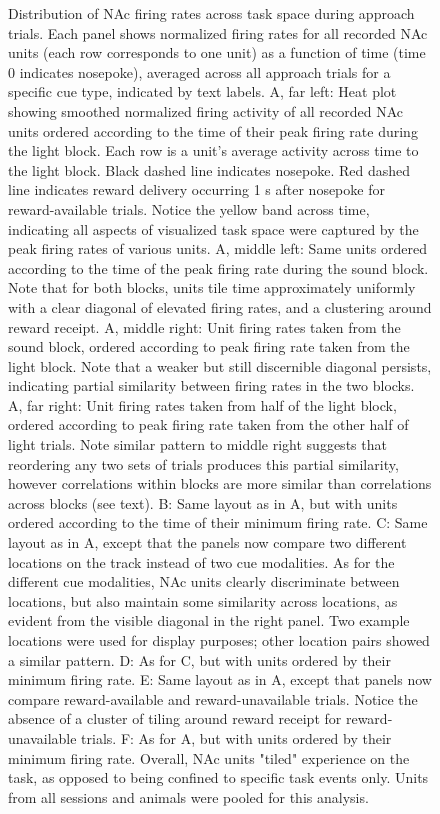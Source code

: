 \documentclass[11pt]{article}
\begin{document}
\begin{figure}[h]
\caption{Distribution of NAc firing rates across task space during approach trials. Each panel shows normalized firing rates for all recorded NAc units (each row corresponds to one unit) as a function of time (time 0 indicates nosepoke), averaged across all approach trials for a specific cue type, indicated by text labels. A, far left: Heat plot showing smoothed normalized firing activity of all recorded NAc units ordered according to the time of their peak firing rate during the light block. Each row is a unit’s average activity across time to the light block. Black dashed line indicates nosepoke. Red dashed line indicates reward delivery occurring 1 s after nosepoke for reward-available trials. Notice the yellow band across time, indicating all aspects of visualized task space were captured by the peak firing rates of various units. A, middle left: Same units ordered according to the time of the peak firing rate during the sound block. Note that for both blocks, units tile time approximately uniformly with a clear diagonal of elevated firing rates, and a clustering around reward receipt. A, middle right: Unit firing rates taken from the sound block, ordered according to peak firing rate taken from the light block. Note that a weaker but still discernible diagonal persists, indicating partial similarity between firing rates in the two blocks. A, far right: Unit firing rates taken from half of the light block, ordered according to peak firing rate taken from the other half of light trials. Note similar pattern to middle right suggests that reordering any two sets of trials produces this partial similarity, however correlations within blocks are more similar than correlations across blocks (see text). B: Same layout as in A, but with units ordered according to the time of their minimum firing rate. C: Same layout as in A, except that the panels now compare two different locations on the track instead of two cue modalities. As for the different cue modalities, NAc units clearly discriminate between locations, but also maintain some similarity across locations, as evident from the visible diagonal in the right panel. Two example locations were used for display purposes; other location pairs showed a similar pattern. D: As for C, but with units ordered by their minimum firing rate. E: Same layout as in A, except that panels now compare reward-available and reward-unavailable trials. Notice the absence of a cluster of tiling around reward receipt for reward-unavailable trials. F: As for A, but with units ordered by their minimum firing rate. Overall, NAc units "tiled" experience on the task, as opposed to being confined to specific task events only. Units from all sessions and animals were pooled for this analysis.}
\label{fig:NP_tiling}
\end{figure}
\end{document}
